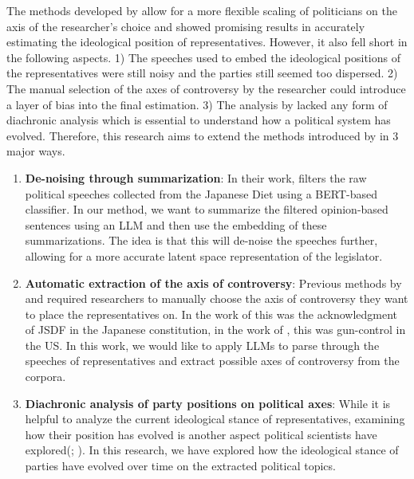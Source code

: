 \documentclass[final,5p,times,twocolumn,authoryear]{elsarticle}
\begin{document}
The methods developed by \citeauthor{kato2024lupinllmbasedpoliticalideology} allow for a more flexible scaling of politicians on the axis of the researcher's choice and showed promising results in accurately estimating the ideological position of representatives. However, it also fell short in the following aspects. 1) The speeches used to embed the ideological positions of the representatives were still noisy and the parties still seemed too dispersed. 2) The manual selection of the axes of controversy by the researcher could introduce a layer of bias into the final estimation. 3) The analysis by \citeauthor{kato2024lupinllmbasedpoliticalideology} lacked any form of diachronic analysis which is essential to understand how a political system has evolved. Therefore, this research aims to extend the methods introduced by \citeauthor{kato2024lupinllmbasedpoliticalideology} in 3 major ways. 
\begin{enumerate}
    \item \textbf{De-noising through summarization}: In their work, \citeauthor{kato2024lupinllmbasedpoliticalideology} filters the raw political speeches collected from the Japanese Diet using a BERT-based classifier. In our method, we want to summarize the filtered opinion-based sentences using an LLM and then use the embedding of these summarizations. The idea is that this will de-noise the speeches further, allowing for a more accurate latent space representation of the legislator. 
    \item \textbf{Automatic extraction of the axis of controversy}: Previous methods by \citeauthor{kato2024lupinllmbasedpoliticalideology} and \citeauthor{llm-latent-position-of-politicians} required researchers to manually choose the axis of controversy they want to place the representatives on. In the work of \citeauthor{kato2024lupinllmbasedpoliticalideology} this was the acknowledgment of JSDF in the Japanese constitution, in the work of \citeauthor{llm-latent-position-of-politicians}, this was gun-control in the US. In this work, we would like to apply LLMs to parse through the speeches of representatives and extract possible axes of controversy from the corpora. 
    \item \textbf{Diachronic analysis of party positions on political axes}: While it is helpful to analyze the current ideological stance of representatives, examining how their position has evolved is another aspect political scientists have explored(\cite{Debating-Evil:-Using-Word-Embeddings-to-Analyze-Parliamentary-Debates}; \cite{Word-embeddings-for-analysis-of-ideological-placement}). In this research, we have explored how the ideological stance of parties have evolved over time on the extracted political topics. 
\end{enumerate}
\end{document}
